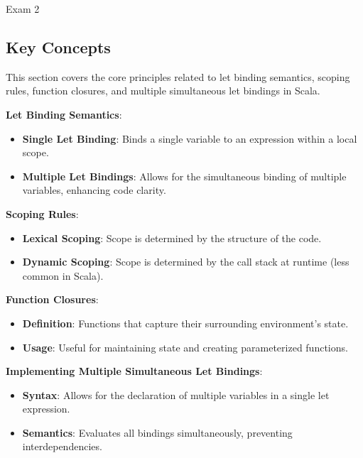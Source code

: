 \begin{examnotes}{Exam 2}
    \subsection*{Key Concepts}
    
    \begin{highlight}
        This section covers the core principles related to let binding semantics, scoping rules, function closures, and multiple simultaneous let bindings in Scala. \vspace*{1em}
    
        \textbf{Let Binding Semantics}:
        \begin{itemize}
            \item \textbf{Single Let Binding}: Binds a single variable to an expression within a local scope.
            \item \textbf{Multiple Let Bindings}: Allows for the simultaneous binding of multiple variables, enhancing code clarity.
        \end{itemize}
        
        \textbf{Scoping Rules}:
        \begin{itemize}
            \item \textbf{Lexical Scoping}: Scope is determined by the structure of the code.
            \item \textbf{Dynamic Scoping}: Scope is determined by the call stack at runtime (less common in Scala).
        \end{itemize}
        
        \textbf{Function Closures}:
        \begin{itemize}
            \item \textbf{Definition}: Functions that capture their surrounding environment's state.
            \item \textbf{Usage}: Useful for maintaining state and creating parameterized functions.
        \end{itemize}
        
        \textbf{Implementing Multiple Simultaneous Let Bindings}:
        \begin{itemize}
            \item \textbf{Syntax}: Allows for the declaration of multiple variables in a single let expression.
            \item \textbf{Semantics}: Evaluates all bindings simultaneously, preventing interdependencies.
        \end{itemize}
    \end{highlight}
\end{examnotes}

